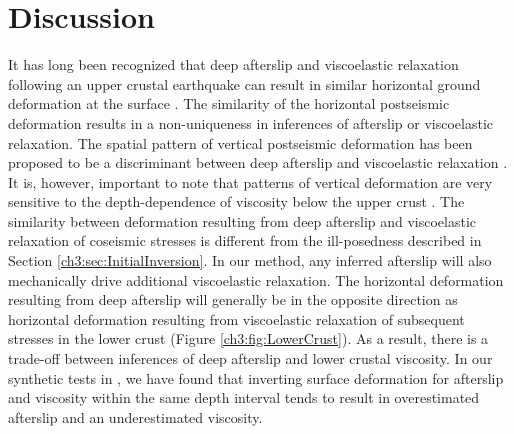 \section{Discussion}\label{Discussion}
It has long been recognized that deep afterslip and viscoelastic relaxation following an upper crustal earthquake can result in similar horizontal ground deformation at the surface \citep[e.g.][]{Savage1990, Pollitz2001, Hearn2003, Feigl2006}. The similarity of the horizontal postseismic deformation results in a non-uniqueness in inferences of afterslip or viscoelastic relaxation.  The spatial pattern of vertical postseismic deformation has been proposed to be a discriminant between deep afterslip and viscoelastic relaxation \citep[e.g.][]{Pollitz2001, Hearn2003}. It is, however, important to note that patterns of vertical deformation are very sensitive to the depth-dependence of viscosity below the upper crust \citep{Yang1981,Hetland2014}.  The similarity between deformation resulting from deep afterslip and viscoelastic relaxation of coseismic stresses is different from the ill-posedness described in Section \ref{ch3:sec:InitialInversion}. In our method, any inferred afterslip will also mechanically drive additional viscoelastic relaxation.  The horizontal deformation resulting from deep afterslip will generally be in the opposite direction as horizontal deformation resulting from viscoelastic relaxation of subsequent stresses in the lower crust (Figure \ref{ch3:fig:LowerCrust}).  As a result, there is a trade-off between inferences of deep afterslip and lower crustal viscosity.  In our synthetic tests in \citet{Hines2016}, we have found that inverting surface deformation for afterslip and viscosity within the same depth interval tends to result in overestimated afterslip and an underestimated viscosity.

